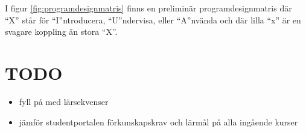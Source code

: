 \documentclass[twocolumn]{article}
\begin{document}
I figur \ref{fig:programdesignmatris} finns en preliminär
programdesignmatris där ``X'' står för ``I''ntroducera, ``U''ndervisa, eller ``A''nvända och
där lilla ``x'' är en svagare koppling än stora ``X''.

\appendix

%
\section{TODO}
\begin{itemize}
\item fyll på med lärsekvenser
\item jämför studentportalen förkunskapskrav och lärmål på alla ingående kurser
\end{itemize}
% 
\end{document}
